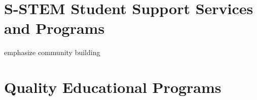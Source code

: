 \documentclass[12pt]{article}
\begin{document}
\section{S-STEM Student Support Services and Programs}




emphasize community building

\section{Quality Educational Programs}
\end{document}
